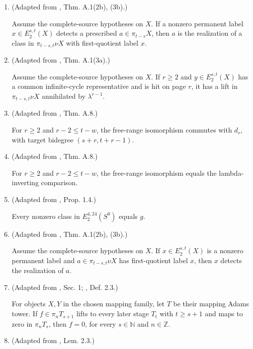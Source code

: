 \begin{theorem}
\begin{enumerate}
For any classical map $f:X\to Y$ of Adams tower filtration at least $k\in\mathbb N$, there is a map $\widetilde f:\nu X\to\Sigma^{0,-k}\nu Y$ with $\lambda^k\widetilde f=\nu f$.
\item (Adapted from \cite{BHS}, Thm. A.1(2b), (3b).)\par{}

Assume the complete-source hypotheses on $X$. If a nonzero permanent label $x\in E_2^{s,t}(X)$ detects a prescribed $a\in\pi_{t-s}X$, then $a$ is the realization of a class in $\pi_{t-s,t}\nu X$ with first-quotient label $x$.
\item (Adapted from \cite{BHS}, Thm. A.1(3a).)\par{}

Assume the complete-source hypotheses on $X$. If $r\ge2$ and $y\in E_2^{s,t}(X)$ has a common infinite-cycle representative and is hit on page $r$, it has a lift in $\pi_{t-s,t}\nu X$ annihilated by $\lambda^{r-1}$.
\item (Adapted from \cite{BHS}, Thm. A.8.)\par{}

For $r\ge2$ and $r-2\le t-w$, the free-range isomorphism commutes with $d_r$, with target bidegree $(s+r,t+r-1)$.
\item (Adapted from \cite{BHS}, Thm. A.8.)\par{}

For $r\ge2$ and $r-2\le t-w$, the free-range isomorphism equals the lambda-inverting comparison.
\item (Adapted from \cite{BR21}, Prop. 1.4.)\par{}

Every nonzero class in $E_2^{4,24}(S^0)$ equals $g$.
\item (Adapted from \cite{BHS}, Thm. A.1(2b), (3b).)\par{}

Assume the complete-source hypotheses on $X$. If $x\in E_2^{s,t}(X)$ is a nonzero permanent label and $a\in\pi_{t-s,t}\nu X$ has first-quotient label $x$, then $x$ detects the realization of $a$.
\item (Adapted from \cite{Moss}, Sec. 1; \cite{BelmontKong2024}, Def. 2.3.)\par{}

For objects $X,Y$ in the chosen mapping family, let $T$ be their mapping Adams tower. If $f\in\pi_n T_{s+1}$ lifts to every later stage $T_t$ with $t\ge s+1$ and maps to zero in $\pi_n T_s$, then $f=0$, for every $s\in\mathbb N$ and $n\in\mathbb Z$.
\item (Adapted from \cite{Adams58}, Lem. 2.3.)\par{}


\end{enumerate}
\end{theorem}
